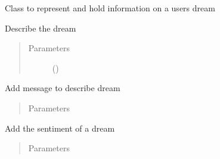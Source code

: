 \documentclass[letterpaper,10pt,english]{sphinxmanual}
\begin{document}
\begin{fulllineitems}
\label{\detokenize{index:Fralysis.Dream.Dream}}
Class to represent and hold information on a users dream

\begin{fulllineitems}
\label{\detokenize{index:Fralysis.Dream.Dream.add_description}}
Describe the dream
\begin{quote}\begin{description}
\item[{Parameters}] \leavevmode
{} () \textendash{} 

\end{description}\end{quote}

\end{fulllineitems}


\begin{fulllineitems}
\label{\detokenize{index:Fralysis.Dream.Dream.add_message}}
Add message to describe dream
\begin{quote}\begin{description}
\item[{Parameters}] \leavevmode
{} \textendash{} 

\end{description}\end{quote}

\end{fulllineitems}


\begin{fulllineitems}
\label{\detokenize{index:Fralysis.Dream.Dream.add_rating}}
Add the sentiment of a dream
\begin{quote}\begin{description}
\item[{Parameters}] \leavevmode
{} \textendash{} 


\end{description}
\end{quote}
\end{fulllineitems}
\end{fulllineitems}
\end{document}
